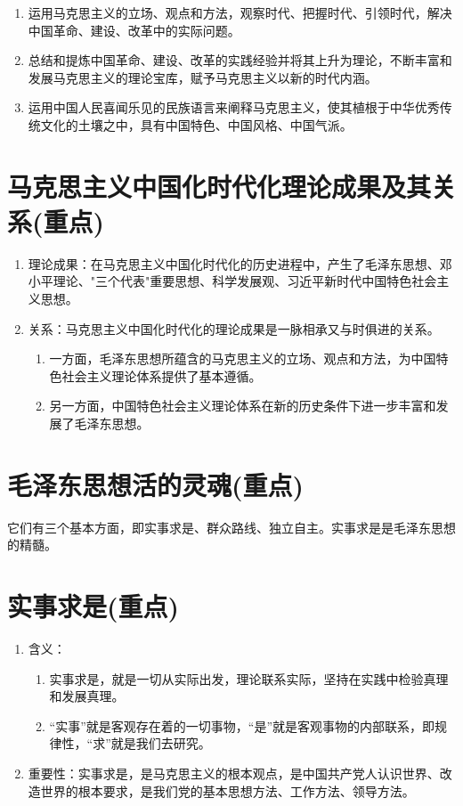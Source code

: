 \documentclass[12pt, a4paper, oneside]{ctexbook}
\begin{document}
\begin{enumerate}
\item 运用马克思主义的立场、观点和方法，观察时代、把握时代、引领时代，解决中国革命、建设、改革中的实际问题。

\item 总结和提炼中国革命、建设、改革的实践经验并将其上升为理论，不断丰富和发展马克思主义的理论宝库，赋予马克思主义以新的时代内涵。

\item 运用中国人民喜闻乐见的民族语言来阐释马克思主义，使其植根于中华优秀传统文化的土壤之中，具有中国特色、中国风格、中国气派。
\end{enumerate}

\section{马克思主义中国化时代化理论成果及其关系(重点)}

\begin{enumerate}
\item 理论成果：在马克思主义中国化时代化的历史进程中，产生了毛泽东思想、邓小平理论、"三个代表"重要思想、科学发展观、习近平新时代中国特色社会主义思想。

\item 关系：马克思主义中国化时代化的理论成果是一脉相承又与时俱进的关系。

\begin{enumerate}[label=(\arabic*)]
\item 一方面，毛泽东思想所蕴含的马克思主义的立场、观点和方法，为中国特色社会主义理论体系提供了基本遵循。

\item 另一方面，中国特色社会主义理论体系在新的历史条件下进一步丰富和发展了毛泽东思想。
\end{enumerate}
\end{enumerate}

\section{毛泽东思想活的灵魂(重点)}
它们有三个基本方面，即实事求是、群众路线、独立自主。实事求是是毛泽东思想的精髓。

\section{实事求是(重点)}

\begin{enumerate}
\item 含义：
\begin{enumerate}[label=(\arabic*)]
\item 实事求是，就是一切从实际出发，理论联系实际，坚持在实践中检验真理和发展真理。

\item “实事”就是客观存在着的一切事物，“是”就是客观事物的内部联系，即规律性，“求”就是我们去研究。
\end{enumerate}

\item 重要性：实事求是，是马克思主义的根本观点，是中国共产党人认识世界、改造世界的根本要求，是我们党的基本思想方法、工作方法、领导方法。
\end{enumerate}
\end{document}
